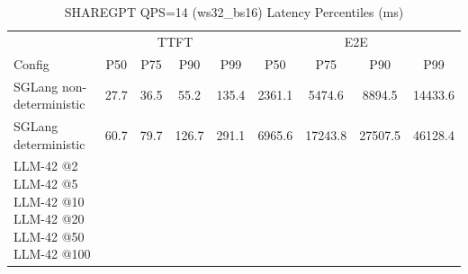 \begin{table}[htbp]
\centering
\caption{SHAREGPT QPS=14 (ws32_bs16) Latency Percentiles (ms)}
\label{tab:sharegpt_qps14_ws32_bs16}
\begin{tabular}{l|cccc|cccc}
\toprule
& \multicolumn{4}{c|}{TTFT} & \multicolumn{4}{c}{E2E} \\
Config & P50 & P75 & P90 & P99 & P50 & P75 & P90 & P99 \\
\midrule
SGLang non-deterministic & 27.7 & 36.5 & 55.2 & 135.4 & 2361.1 & 5474.6 & 8894.5 & 14433.6 \\
SGLang deterministic & 60.7 & 79.7 & 126.7 & 291.1 & 6965.6 & 17243.8 & 27507.5 & 46128.4 \\
LLM-42 @2%
LLM-42 @5%
LLM-42 @10%
LLM-42 @20%
LLM-42 @50%
LLM-42 @100%
\bottomrule
\end{tabular}
\end{table}
